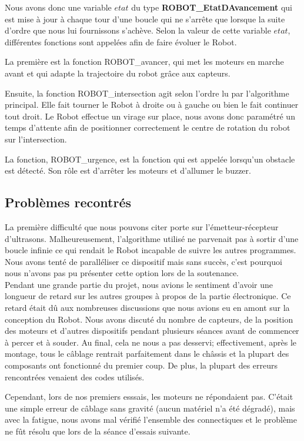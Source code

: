 \documentclass[a4paper,12pt]{article}
\begin{document}
Nous avons donc une variable $etat$ du type \textbf{ROBOT\_EtatDAvancement} qui est mise à jour à chaque tour d'une boucle qui ne s'arrête que lorsque la suite d'ordre que nous lui fournissons s'achève.
Selon la valeur de cette variable $etat$, différentes fonctions sont appelées afin de faire évoluer le Robot.

La première est la fonction ROBOT\_avancer, qui met les moteurs en marche avant et qui adapte la trajectoire du robot grâce aux capteurs.

Ensuite, la fonction ROBOT\_intersection agit selon l'ordre lu par l'algorithme principal. Elle fait tourner le Robot à droite ou à gauche ou bien le fait continuer tout droit.
Le Robot effectue un virage sur place, nous avons donc paramétré un temps d'attente afin de positionner correctement le centre de rotation du robot sur l'intersection.

La fonction, ROBOT\_urgence, est la fonction qui est appelée lorsqu'un obstacle est détecté. Son rôle est d'arrêter les moteurs et d'allumer le buzzer.

\subsection{Problèmes recontrés}

La première difficulté que nous pouvons citer porte sur l'émetteur-récepteur d'ultrasons.
Malheureusement, l'algorithme utilisé ne parvenait pas à sortir d'une boucle infinie ce qui rendait le Robot incapable de suivre les autres programmes.
Nous avons tenté de paralléliser ce dispositif mais sans succès, c'est pourquoi nous n'avons pas pu présenter cette option lors de la soutenance.\\

Pendant une grande partie du projet, nous avions le sentiment d'avoir une longueur de retard sur les autres groupes à propos de la partie électronique. 
Ce retard était dû aux nombreuses discussions que nous avions eu en amont sur la conception du Robot.
Nous avons discuté du nombre de capteurs, de la position des moteurs et d'autres dispositifs pendant plusieurs séances avant de commencer à percer et à souder.
Au final, cela ne nous a pas desservi; effectivement, après le montage, tous le câblage rentrait parfaitement dans le châssis et la plupart des composants ont fonctionné du premier coup.
De plus, la plupart des erreurs rencontrées venaient des codes utilisés.

Cependant, lors de nos premiers esssais, les moteurs ne répondaient pas. C'était une simple erreur de câblage sans gravité (aucun matériel n'a été dégradé), 
mais avec la fatigue, nous avons mal vérifié l'ensemble des connectiques et le problème ne fût résolu que lors de la séance d'essais suivante.
\end{document}
